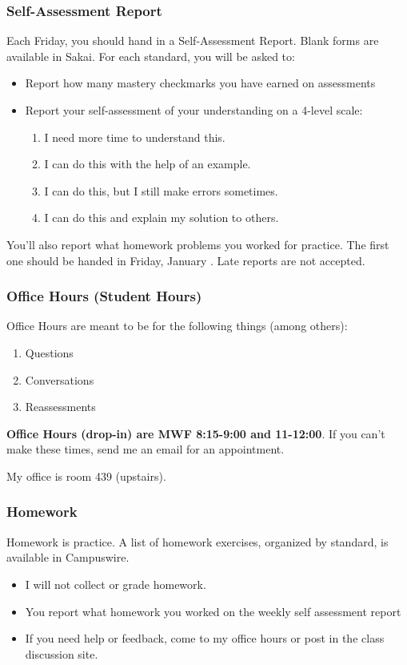 \documentclass[aspectration=1610]{beamer}
\begin{document}
\begin{frame}\frametitle{Self-Assessment Report}
Each Friday, you should hand in a Self-Assessment Report.  Blank forms are available in Sakai.
\vfill
For each standard, you will be asked to:
\begin{itemize}
\item Report how many mastery checkmarks you have earned on assessments
\item Report your self-assessment of your understanding on a 4-level scale:
\begin{enumerate}[1.]
\item I need more time to understand this.
\item  I can do this with the help of an example.
\item I can do this, but I still make errors sometimes.
\item I can do this and explain my solution to others.
\end{enumerate}
\end{itemize}
\vfill
You'll also report what homework problems you worked for practice.
\vfill
The first one should be handed in Friday, January .  Late reports are not accepted.
\end{frame}







\begin{frame}\frametitle{Office Hours (Student Hours)}
Office Hours are meant to be for the following things (among others):
\begin{enumerate}
\item Questions
\item Conversations
\item Reassessments
\end{enumerate}

\vspace{0.2in}

{\bf Office Hours (drop-in) are MWF 8:15-9:00 and 11-12:00}.  If you can't make these times, send me an email for an appointment.

\vspace{0.1in}
My office is room 439 (upstairs).

\end{frame}



\begin{frame}\frametitle{Homework}
Homework is practice.  A list of homework exercises, organized by standard, is available in Campuswire.
\begin{itemize}
\item I will not collect or grade homework.
\item You report what homework you worked on the weekly self assessment report
\item If you need help or feedback, come to my office hours or post in the class discussion site.
\end{itemize}
\end{frame}
\end{document}

